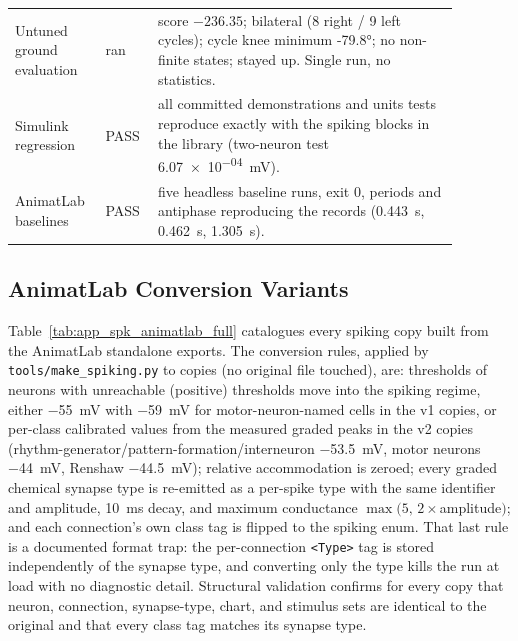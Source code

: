 \begin{table}
\begin{tabular}{@{}p{0.16\linewidth}p{0.10\linewidth}p{0.62\linewidth}@{}}
Untuned ground evaluation & ran & score $-236.35$; bilateral (8 right / 9 left cycles); cycle knee minimum \ang{-79.8}; no non-finite states; stayed up. Single run, no statistics. \\
Simulink regression & PASS & all committed demonstrations and units tests reproduce exactly with the spiking blocks in the library (two-neuron test \qty{6.07e-04}{\mV}). \\
AnimatLab baselines & PASS & five headless baseline runs, exit 0, periods and antiphase reproducing the records (\qty{0.443}{\second}, \qty{0.462}{\second}, \qty{1.305}{\second}). \\
\bottomrule
\end{tabular}
\end{table}

\subsection{AnimatLab Conversion Variants}

Table~\ref{tab:app_spk_animatlab_full} catalogues every spiking copy built from the AnimatLab standalone exports. The conversion rules, applied by \texttt{tools/make\_spiking.py} to copies (no original file touched), are: thresholds of neurons with unreachable (positive) thresholds move into the spiking regime, either \qty{-55}{\mV} with \qty{-59}{\mV} for motor-neuron-named cells in the v1 copies, or per-class calibrated values from the measured graded peaks in the v2 copies (rhythm-generator/pattern-formation/interneuron \qty{-53.5}{\mV}, motor neurons \qty{-44}{\mV}, Renshaw \qty{-44.5}{\mV}); relative accommodation is zeroed; every graded chemical synapse type is re-emitted as a per-spike type with the same identifier and amplitude, \qty{10}{\ms} decay, and maximum conductance $\max(5,\,2\times$amplitude$)$; and each connection's own class tag is flipped to the spiking enum. That last rule is a documented format trap: the per-connection \texttt{<Type>} tag is stored independently of the synapse type, and converting only the type kills the run at load with no diagnostic detail. Structural validation confirms for every copy that neuron, connection, synapse-type, chart, and stimulus sets are identical to the original and that every class tag matches its synapse type.

